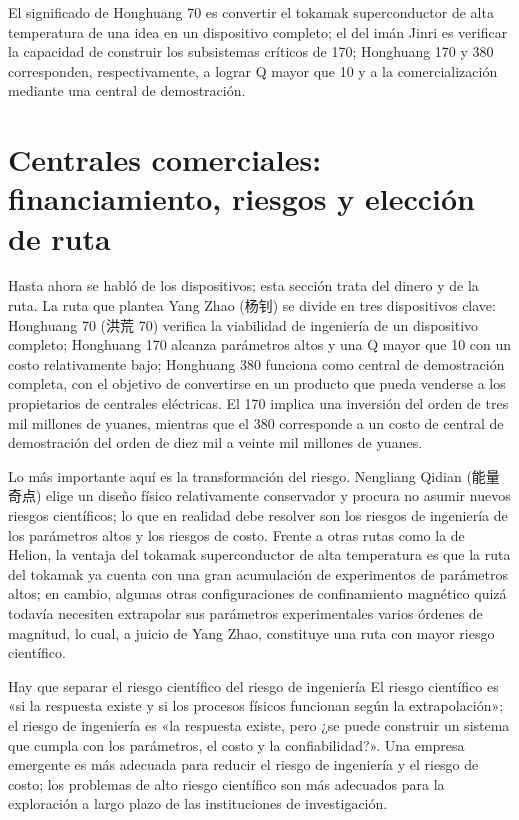 \documentclass[a4paper]{article}
\begin{document}
El significado de Honghuang 70 es convertir el tokamak superconductor de alta temperatura de una idea en un dispositivo completo; el del imán Jinri es verificar la capacidad de construir los subsistemas críticos de 170; Honghuang 170 y 380 corresponden, respectivamente, a lograr Q mayor que 10 y a la comercialización mediante una central de demostración.
\section{Centrales comerciales: financiamiento, riesgos y elección de ruta}

Hasta ahora se habló de los dispositivos; esta sección trata del dinero y de la ruta. La ruta que plantea Yang Zhao (杨钊) se divide en tres dispositivos clave: Honghuang 70 (洪荒 70) verifica la viabilidad de ingeniería de un dispositivo completo; Honghuang 170 alcanza parámetros altos y una Q mayor que 10 con un costo relativamente bajo; Honghuang 380 funciona como central de demostración completa, con el objetivo de convertirse en un producto que pueda venderse a los propietarios de centrales eléctricas. El 170 implica una inversión del orden de tres mil millones de yuanes, mientras que el 380 corresponde a un costo de central de demostración del orden de diez mil a veinte mil millones de yuanes.

Lo más importante aquí es la transformación del riesgo. Nengliang Qidian (能量奇点) elige un diseño físico relativamente conservador y procura no asumir nuevos riesgos científicos; lo que en realidad debe resolver son los riesgos de ingeniería de los parámetros altos y los riesgos de costo. Frente a otras rutas como la de Helion, la ventaja del tokamak superconductor de alta temperatura es que la ruta del tokamak ya cuenta con una gran acumulación de experimentos de parámetros altos; en cambio, algunas otras configuraciones de confinamiento magnético quizá todavía necesiten extrapolar sus parámetros experimentales varios órdenes de magnitud, lo cual, a juicio de Yang Zhao, constituye una ruta con mayor riesgo científico.

\begin{warningbox}{Hay que separar el riesgo científico del riesgo de ingeniería}
El riesgo científico es «si la respuesta existe y si los procesos físicos funcionan según la extrapolación»; el riesgo de ingeniería es «la respuesta existe, pero ¿se puede construir un sistema que cumpla con los parámetros, el costo y la confiabilidad?». Una empresa emergente es más adecuada para reducir el riesgo de ingeniería y el riesgo de costo; los problemas de alto riesgo científico son más adecuados para la exploración a largo plazo de las instituciones de investigación.
\end{warningbox}
\end{document}
